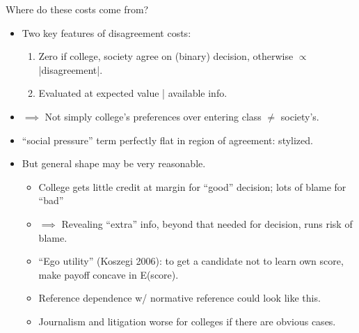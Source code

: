 \documentclass[11pt, aspectratio=169]{beamer}
\theoremstyle{plain}
\theoremstyle{plain}
\theoremstyle{plain}
\theoremstyle{plain}
\begin{document}





    

\begin{frame}{Where do these costs come from?}
    \pause
    \begin{itemize}
        \item Two key features of disagreement costs: \pause
        \begin{enumerate}
            \item Zero if college, society agree on (binary) decision, otherwise $\propto$ |disagreement|. \pause
            \item Evaluated at expected value | available info. \pause
        \end{enumerate}
        \item $\implies$ Not simply college's preferences over entering class $\neq$ society's.  \pause
        \item ``social pressure'' term perfectly flat in region of agreement: stylized. \pause
        \item But general shape may be very reasonable. \pause
        \begin{itemize}
            \item College gets little credit at margin for ``good'' decision; lots of blame for ``bad'' \pause
            \item $\implies$ Revealing ``extra'' info, beyond that needed for decision, runs risk of blame. \pause
            \item ``Ego utility'' (Koszegi 2006): to get a candidate not to learn own score, make payoff concave in E(score).  \pause
            \item Reference dependence w/ normative reference could look like this.  \pause
            \item Journalism and litigation worse for colleges if there are obvious cases.
        \end{itemize}
    \end{itemize}
\end{frame}
\end{document}
